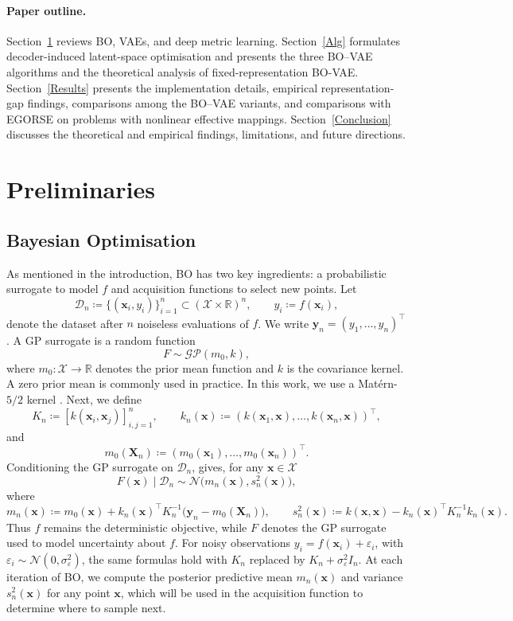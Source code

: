 \documentclass[pdflatex,sn-mathphys-num]{sn-jnl}%
\theoremstyle{thmstyleone}%
\theoremstyle{thmstyletwo}%
\theoremstyle{thmstylethree}%
\begin{document}
\paragraph{Paper outline.}

Section~\ref{Prelim} reviews BO, VAEs, and deep metric learning. Section~\ref{Alg} formulates decoder-induced latent-space optimisation and presents the three BO--VAE algorithms and the theoretical analysis of fixed-representation BO-VAE. Section~\ref{Results} presents the implementation details, empirical representation-gap findings, comparisons among the BO--VAE variants, and comparisons with EGORSE on problems with nonlinear effective mappings. Section~\ref{Conclusion} discusses the theoretical and empirical findings, limitations, and future directions.

\section{Preliminaries}\label{Prelim}

\subsection{Bayesian Optimisation}
As mentioned in the introduction, BO has two key ingredients: a probabilistic surrogate to model $f$ and acquisition functions to select new points. Let
\[
    \mathcal D_n \coloneq \{(\mathbf x_i,y_i)\}_{i=1}^n \subset (\mathcal{X} \times \mathbb R)^n,
    \qquad y_i \coloneq f(\mathbf x_i),
\]
denote the dataset after \(n\) noiseless evaluations of \(f\). We write \(\mathbf y_n=(y_1,\ldots,y_n)^\top\). A GP surrogate is a random function
\[
    F \sim \mathcal{GP}(m_0,k),
\]
where \(m_0: \mathcal X\to\mathbb R\) denotes the prior mean function and \(k\) is the covariance kernel. A zero prior mean is commonly used in practice. In this work, we use a Matérn-\(5/2\) kernel \cite{Rasmussen2006}. Next, we define \[
    K_n \coloneq [k(\mathbf x_i,\mathbf x_j)]_{i,j=1}^n,
    \qquad
    k_n(\mathbf x) \coloneq (k(\mathbf x_1,\mathbf x),\ldots,k(\mathbf x_n,\mathbf x))^\top,
\]
and
\[
    m_0(\mathbf X_n) \coloneq (m_0(\mathbf x_1),\ldots,m_0(\mathbf x_n))^\top.
\]
Conditioning the GP surrogate on \(\mathcal D_n\), \cite{Bishop2006} gives, for any
\(\mathbf x\in\mathcal X\)
\[
    F(\mathbf x)\mid \mathcal D_n
    \sim
    \mathcal N\bigl(m_n(\mathbf x),s_n^2(\mathbf x)\bigr),
\]
where
\[
    m_n(\mathbf x)
    \coloneq
    m_0(\mathbf x)
    +
    k_n(\mathbf x)^\top K_n^{-1}
    \bigl(\mathbf y_n-m_0(\mathbf X_n)\bigr),
\qquad
    s_n^2(\mathbf x)
    \coloneq
    k(\mathbf x,\mathbf x)
    -
    k_n(\mathbf x)^\top K_n^{-1}k_n(\mathbf x).
\]
Thus \(f\) remains the deterministic objective, while \(F\) denotes the GP surrogate used to model uncertainty about \(f\). For noisy observations \(y_i=f(\mathbf x_i)+\varepsilon_i\), with \(\varepsilon_i\sim\mathcal N(0,\sigma_\varepsilon^2)\), the same formulas hold with \(K_n\) replaced by \(K_n+\sigma_\varepsilon^2 I_n\). At each iteration of BO, we compute the posterior predictive mean $m_n(\mathbf x)$ and variance $s_n^2(\mathbf x)$ for any point $\mathbf{x}$, which will be used in the acquisition function to determine where to sample next.\\
\end{document}
